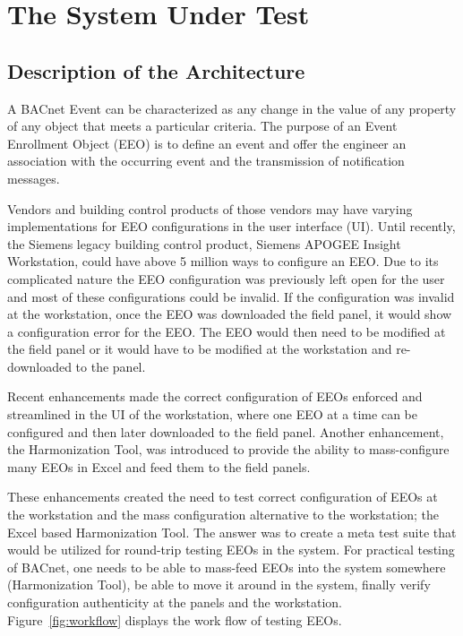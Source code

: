 \documentclass[conference]{IEEEtran}
\begin{document}
\section{The System Under Test}

	\subsection{Description of the Architecture}
	
	A BACnet Event can be characterized as any change in the value of any property of any object
that meets a particular criteria. The purpose of an Event Enrollment Object (EEO) is to define an
event and offer the engineer an association with the occurring event and the transmission of notification messages.

Vendors and building control products of those vendors may have varying implementations
for EEO configurations in the user interface (UI).
Until recently, the Siemens legacy building control product,
Siemens APOGEE Insight Workstation, could have above 5 million ways to configure an EEO.
Due to its complicated nature
the EEO configuration was previously left open for the user and most of these configurations could be invalid.
If the configuration was invalid at the workstation, once the EEO was downloaded the field panel, it would show a configuration error for the EEO. The EEO would then need to be modified at the field panel or it would have to be 
modified at the workstation and re-downloaded to the panel.

	Recent enhancements made the correct configuration of EEOs enforced and streamlined in the UI of the workstation, where one EEO at a time can be configured and then later downloaded to the field panel. 
Another enhancement, the Harmonization Tool, was introduced to provide the ability to mass-configure many
EEOs in Excel and feed them to the field panels.

	These enhancements created the need to test correct configuration of EEOs at the workstation and the mass configuration alternative to the workstation; the Excel based Harmonization Tool.  
The answer was to create a meta test suite that would be utilized for round-trip testing EEOs in the system.
For practical testing of BACnet, one needs to be able to mass-feed EEOs into the system somewhere (Harmonization Tool),
be able to move it around in the system, finally verify configuration authenticity at the panels and the workstation.
Figure~\ref{fig:workflow} displays the work flow of testing EEOs. 
                
\end{document}
